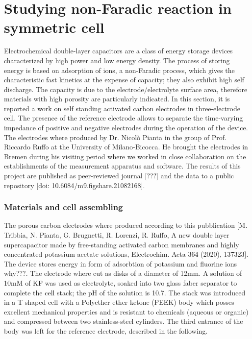\chapter{Studying non-Faradic reaction in symmetric cell}

Electrochemical double-layer capacitors are a class of energy storage devices characterized by high power and low energy density. The process of storing energy is based on adsorption of ions, a non-Faradic process, which gives the characteristic fast kinetics at the expense of capacity; they also exhibit high self discharge. The capacity is due to the electrode/electrolyte surface area, therefore materials with high porosity are particularly indicated. In this section, it is reported a work on self standing activated carbon electrodes in three-electrode cell. The presence of the reference electrode allows to separate the time-varying impedance of positive and negative electrodes during the operation of the device.
The electrodes where produced by Dr. Nicolò Pianta in the group of Prof. Riccardo Ruffo at the University of Milano-Bicocca. He brought the electrodes in Bremen during his visiting period where we worked in close collaboration on the establishments of the measurement apparatus and software. The results of this project are published as peer-reviewed journal [???] and the data to a public repository [doi: 10.6084/m9.figshare.21082168].

\subsection{Materials and cell assembling}

The porous carbon electrodes where produced according to this pubblication [M. Tribbia, N. Pianta, G. Brugnetti, R. Lorenzi, R. Ruffo, A new double layer supercapacitor made by free-standing activated carbon membranes and highly concentrated potassium acetate solutions, Electrochim. Acta 364 (2020), 137323]. The device stores energy in form of adsorbtion of potassium and fluorine ions \colorbox{BurntOrange}{why???}.  The electrode where cut as disks of a diameter of 12mm. A solution of 10mM of KF was used as electrolyte, soaked into two glass faber separator to complete the cell stack; the pH of the solution is 10.7. The stack was introduced in a T-shaped cell with a Polyether ether ketone (PEEK) body which posses excellent mechanical properties and is resistant to chemicals (aqueous or organic) and compressed between two stainless-steel cylinders. The third entrance of the body was left for the reference electrode, described in the following. 


